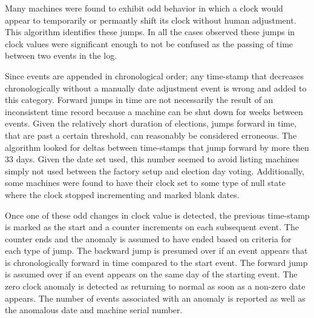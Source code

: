 Many machines were found to exhibit odd behavior in which a clock would appear
to temporarily or permantly shift its clock without human adjustment. This
algorithm identifies these jumps.  In all the cases observed these jumps in
clock values were significant enough to not be confused as the passing of time
between two events in the log. 

Since events are appended in chronological order; any time-stamp that decreases
chronologically without a manually date adjustment event is wrong and added to
this category. Forward jumps in time are not necessarily the result of an
inconsistent time record because a machine can be shut down for weeks between
events.  Given the relatively short duration of elections, jumps forward in
time, that are past a certain threshold, can reasonably be considered erroneous.
The algorithm looked for deltas between time-stamps that jump forward by more
then 33 days.  Given the date set used, this number seemed to avoid listing
machines simply not used between the factory setup and election day voting.
Additionally, some machines were found to have their clock set to some type of
null state where the clock stopped incrementing and marked blank dates. 

Once one of these odd changes in clock value is detected, the previous
time-stamp is marked as the start and a counter increments on each subsequent
event.  The counter ends and the anomaly is assumed to have ended based on
criteria for each type of jump. The backward jump is presumed over if an event
appears that is chronologically forward in time compared to the start event.
The forward jump is assumed over if an event appears on the same day of the
starting event.  The zero clock anomaly is detected as returning to normal as
soon as a non-zero date appears. The number of events associated with an anomaly
is reported as well as the anomalous date and machine serial number. 

